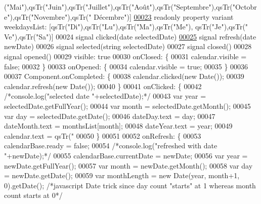 \begin{DoxyCode}
      (\textcolor{stringliteral}{"Mai"}),qsTr(\textcolor{stringliteral}{"Juin"}),qsTr(\textcolor{stringliteral}{"Juillet"}),qsTr(\textcolor{stringliteral}{"Août"}),qsTr(\textcolor{stringliteral}{"Septembre"}),qsTr(\textcolor{stringliteral}{"Octobre"}),qsTr(\textcolor{stringliteral}{"Novembre"}),qsTr(\textcolor{stringliteral}{"
      Décembre"})]
\hypertarget{SH__CalendarDialog_8qml_source_l00023}{}\hyperlink{classSH__CalendarDialog_a86a4ef51cbfb7299a55bbddf2ae60f6a}{00023}     readonly \textcolor{keyword}{property} variant weekdaysList: [qsTr(\textcolor{stringliteral}{"Di"}),qsTr(\textcolor{stringliteral}{"Lu"}),qsTr(\textcolor{stringliteral}{"Ma"}),qsTr(\textcolor{stringliteral}{"Me"}), qsTr(\textcolor{stringliteral}{"Je"}),qsTr(\textcolor{stringliteral}{"
      Ve"}),qsTr(\textcolor{stringliteral}{"Sa"})]
00024     signal clicked(date selectedDate)
\hypertarget{SH__CalendarDialog_8qml_source_l00025}{}\hyperlink{classSH__CalendarDialog_a4ceac0c8c8f2b0d05060ddd66986b8e0}{00025}     signal refresh(date newDate)
00026     signal selected(\textcolor{keywordtype}{string} selectedDate)
00027     signal closed()
00028     signal opened()
00029     visible: true
00030     onClosed: \{
00031         calendar.visible = \textcolor{keyword}{false};
00032     \}
00033     onOpened: \{
00034         calendar.visible = \textcolor{keyword}{true};
00035     \}
00036 
00037     Component.onCompleted: \{
00038         calendar.clicked(\textcolor{keyword}{new} Date());
00039         calendar.refresh(\textcolor{keyword}{new} Date());
00040     \}
00041     onClicked: \{
00042         \textcolor{comment}{/*console.log("selected date "+selectedDate);*/}
00043         var year = selectedDate.getFullYear();
00044         var month = selectedDate.getMonth();
00045         var day = selectedDate.getDate();
00046         dateDay.text = day;
00047         dateMonth.text = monthsList[month];
00048         dateYear.text = year;
00049         calendar.text = qsTr(\textcolor{stringliteral}{"%
00050     \}
00051 
00052     onRefresh: \{
00053         calendarBase.ready = \textcolor{keyword}{false};
00054         \textcolor{comment}{/*console.log("refreshed with date "+newDate);*/}
00055         calendarBase.currentDate = newDate;
00056         var year = newDate.getFullYear();
00057         var month = newDate.getMonth();
00058         var day = newDate.getDate();
00059         var monthLength = \textcolor{keyword}{new} Date(year, month+1, 0).getDate(); \textcolor{comment}{/*javascript Date trick since day count
       "starts" at 1 whereas month count starts at 0*/}
}
\end{DoxyCode}

